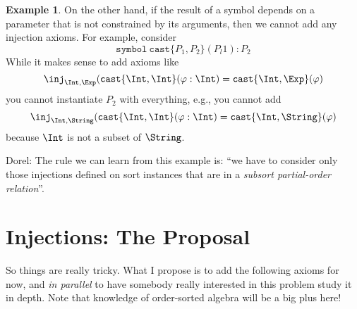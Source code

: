\documentclass{article}
\newcommand\comment[2]{\par\noindent\color{red}#1: #2\color{black}\par\noindent}
\newcommand\dl{\comment{Dorel}}
\theoremstyle{definition}
\newtheorem{example}{Example}[section]
\theoremstyle{definition}
\theoremstyle{definition}
\theoremstyle{theorem}
\theoremstyle{theorem}
\theoremstyle{theorem}
\newcommand{\poly}[2]{\texttt{#1}\{#2\}}
\newcommand{\KWsymbol}{\texttt{symbol}}
\begin{document}
\begin{example}\label{consistency-parametric-result-free}
On the other hand, if the result of a symbol depends on
a parameter that is not constrained by its arguments,
then we cannot add any injection axioms.
For example, consider
\[\KWsymbol\ \poly{cast}{P_1,P_2}(P_l1):P_2\]
While it makes sense to add axioms like
\[\inj_{\Int,\Exp}(\poly{cast}{\Int,\Int}(\varphi:\Int)
= \poly{cast}{\Int,\Exp}(\varphi)\]
you cannot instantiate \(P_2\) with everything, e.g., you cannot add
\[\inj_{\Int,\String}(\poly{cast}{\Int,\Int}(\varphi:\Int)
= \poly{cast}{\Int,\String}(\varphi)\]
because \(\Int\) is not a subset of \(\String\).
\dl{The rule we can learn from this example is: ``we have to consider only those injections defined on sort instances that are in a \emph{subsort partial-order relation}''.
}
\end{example}

\section{Injections: The Proposal}
So things are really tricky.
What I propose is to add the following axioms for now,
and \emph{in parallel} to have somebody really interested in this
problem study it in depth.
Note that knowledge of order-sorted algebra will be a big plus here!
\end{document}
